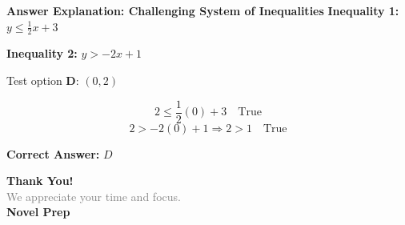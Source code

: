 \documentclass{beamer}
\begin{document}
\begin{frame}{\textbf{Answer Explanation: Challenging System of Inequalities}}
    \textbf{Inequality 1:} \(y \leq \frac{1}{2}x + 3\)

    \textbf{Inequality 2:} \(y > -2x + 1\)

    \vspace{0.5em}
    Test option \textbf{D}: \((0, 2)\)

    \[
    2 \leq \frac{1}{2}(0) + 3 \quad \text{True}
    \]
    \[
    2 > -2(0) + 1 \Rightarrow 2 > 1 \quad \text{True}
    \]

    \textbf{Correct Answer:} \( \boxed{D} \)
\end{frame}

\begin{frame}{}

    \centering
    \vspace{5em}

    {\Huge \textbf{\textcolor{novelPurple}{Thank You!}}} \\[1em]
    {\large \textcolor{gray}{We appreciate your time and focus.}} \\[3em]

    {\LARGE \textbf{\textcolor{novelPurple}{\textsf{Novel Prep}}}}

    \vfill
\end{frame}
\end{document}
